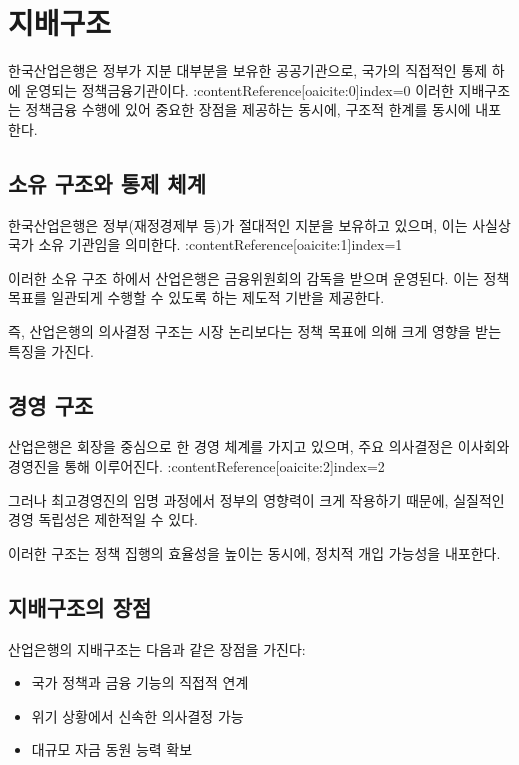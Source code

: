 \section{지배구조}

한국산업은행은 정부가 지분 대부분을 보유한 공공기관으로, 국가의 직접적인 통제 하에 운영되는 정책금융기관이다. :contentReference[oaicite:0]{index=0}  
이러한 지배구조는 정책금융 수행에 있어 중요한 장점을 제공하는 동시에, 구조적 한계를 동시에 내포한다.

\subsection{소유 구조와 통제 체계}

한국산업은행은 정부(재정경제부 등)가 절대적인 지분을 보유하고 있으며, 이는 사실상 국가 소유 기관임을 의미한다. :contentReference[oaicite:1]{index=1}  

이러한 소유 구조 하에서 산업은행은 금융위원회의 감독을 받으며 운영된다. 이는 정책 목표를 일관되게 수행할 수 있도록 하는 제도적 기반을 제공한다.

즉, 산업은행의 의사결정 구조는 시장 논리보다는 정책 목표에 의해 크게 영향을 받는 특징을 가진다.

\subsection{경영 구조}

산업은행은 회장을 중심으로 한 경영 체계를 가지고 있으며, 주요 의사결정은 이사회와 경영진을 통해 이루어진다. :contentReference[oaicite:2]{index=2}  

그러나 최고경영진의 임명 과정에서 정부의 영향력이 크게 작용하기 때문에, 실질적인 경영 독립성은 제한적일 수 있다.

이러한 구조는 정책 집행의 효율성을 높이는 동시에, 정치적 개입 가능성을 내포한다.

\subsection{지배구조의 장점}

산업은행의 지배구조는 다음과 같은 장점을 가진다:

\begin{itemize}
    \item 국가 정책과 금융 기능의 직접적 연계
    \item 위기 상황에서 신속한 의사결정 가능
    \item 대규모 자금 동원 능력 확보
\end{itemize}

